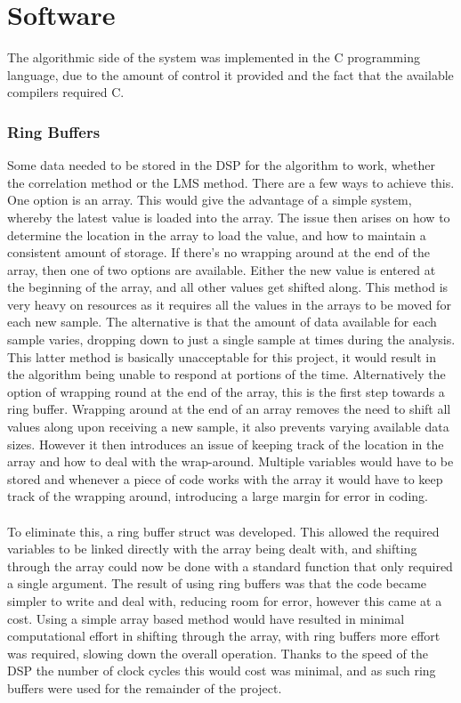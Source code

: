 \section{Software}
The algorithmic side of the system was implemented in the C programming language, due to the amount of control it provided and the fact that the available compilers required C.

\subsubsection{Ring Buffers}

Some data needed to be stored in the DSP for the algorithm to work, whether the correlation method or the LMS method.
There are a few ways to achieve this.
One option is an array.
This would give the advantage of a simple system, whereby the latest value is loaded into the array.
The issue then arises on how to determine the location in the array to load the value, and how to maintain a consistent amount of storage.
If there's no wrapping around at the end of the array, then one of two options are available.
Either the new value is entered at the beginning of the array, and all other values get shifted along.
This method is very heavy on resources as it requires all the values in the arrays to be moved for each new sample.
The alternative is that the amount of data available for each sample varies, dropping down to just a single sample at times during the analysis.
This latter method is basically unacceptable for this project, it would result in the algorithm being unable to respond at portions of the time.
Alternatively the option of wrapping round at the end of the array, this is the first step towards a ring buffer.
Wrapping around at the end of an array removes the need to shift all values along upon receiving a new sample, it also prevents varying available data sizes.
However it then introduces an issue of keeping track of the location in the array and how to deal with the wrap-around.
Multiple variables would have to be stored and whenever a piece of code works with the array it would have to keep track of the wrapping around, introducing a large margin for error in coding.
\\
\\
To eliminate this, a ring buffer struct was developed.
This allowed the required variables to be linked directly with the array being dealt with, and shifting through the array could now be done with a standard function that only required a single argument.
The result of using ring buffers was that the code became simpler to write and deal with, reducing room for error, however this came at a cost.
Using a simple array based method would have resulted in minimal computational effort in shifting through the array, with ring buffers more effort was required, slowing down the overall operation.
Thanks to the speed of the DSP the number of clock cycles this would cost was minimal, and as such ring buffers were used for the remainder of the project.

